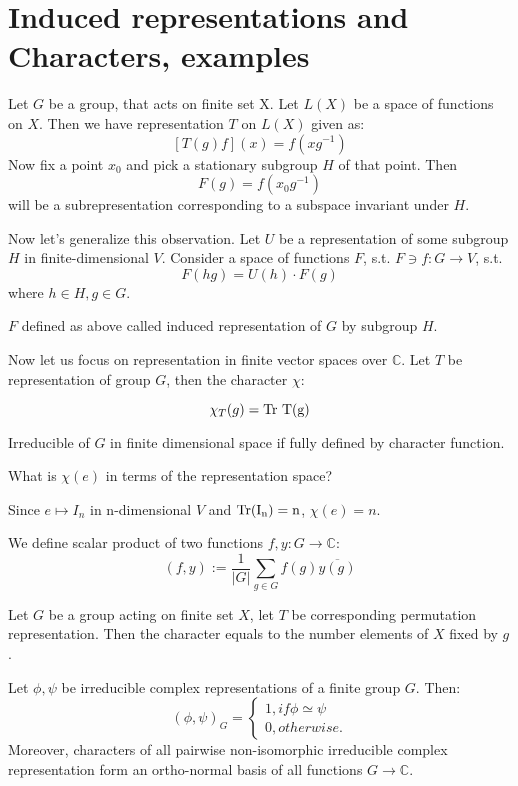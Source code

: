 \documentclass{amsart}
\def\Tr{\rm Tr}
\begin{document}
\section{Induced representations and Characters, examples}

Let $G$ be a group, that acts on finite set X. Let $L(X)$ be a space of functions on $X$. Then we have representation $T$ on $L(X)$ given as:
$$\left[T(g) f\right] (x) = f (x g^{-1}) $$
Now fix a point $x_0$ and pick a stationary subgroup $H$ of that point. Then
$$ F(g) = f(x_0 g^{-1}) $$
will be a subrepresentation corresponding to a subspace invariant under $H$.

Now let's generalize this observation. Let $U$ be a representation of some subgroup $H$ in finite-dimensional $V$.
Consider a space of functions $F$, s.t. $F\ni f: G \to V$, s.t.
$$F(hg) = U(h) \cdot F(g)$$
where $h\in H, g \in G$.

\begin{definition}
    $F$ defined as above called induced representation of $G$ by subgroup $H$.
\end{definition}

Now let us focus on representation in finite vector spaces over $\mathbb{C}$.
Let $T$ be representation of group $G$, then the character $\chi$:
\begin{definition}
    $$\chi_T (g) = \Tr \ T (g) $$
\end{definition}
\begin{theorem}
Irreducible of $G$ in finite dimensional space if fully defined by character function.
\end{theorem}
What is $\chi (e)$ in terms of the representation space?

Since $e \mapsto I_n$ in n-dimensional $V$ and $\Tr (I_n) = n$, $\chi(e) = n$.

\begin{definition} 
    We define scalar product of two functions $f,y: G \to \mathbb{C}$:
    $$(f,y) := \frac{1}{|G|} \sum_{g \in G} f(g) \overline{y(g)}$$
\end{definition}

\begin{lemma}
    Let $G$ be a group acting on finite set $X$, let $T$ be corresponding permutation representation. Then the character equals to the number elements of $X$ fixed by $g$.
\end{lemma}

\begin{theorem}
    Let $\phi, \psi$ be irreducible complex representations of a finite group $G$. Then:
    $$(\phi, \psi)_G = 
    \begin{cases}
        1, if \phi \simeq \psi\\
        0, otherwise.
    \end{cases}
    $$
    Moreover, characters of all pairwise non-isomorphic irreducible complex representation form an ortho-normal basis of all functions $G\to \mathbb{C}$.
\end{theorem}
\end{document}
